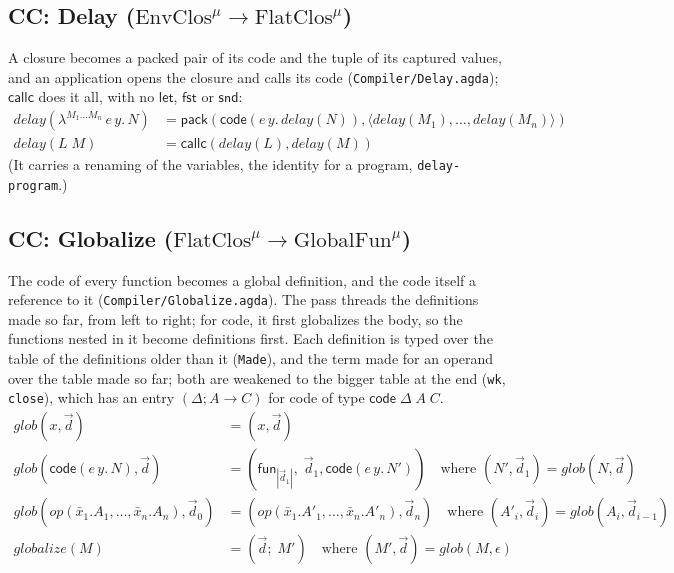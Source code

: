 \documentclass[10pt]{article}
\theoremstyle{acmplain}
\newcommand{\key}[1]{\mathsf{#1}}
\newcommand{\pass}[1]{\mathit{#1}}
\newcommand{\clos}[2]{\lambda^{#1}\, #2.\,}
\newcommand{\tuple}[1]{\langle #1 \rangle}
\newcommand{\funref}[1]{\key{fun}_{#1}}
\newcommand{\Tcodetm}[3]{\key{code}(#1\,#2.\,#3)}  %
\newcommand{\Tpack}[2]{\key{pack}(#1, #2)}     %
\newcommand{\Tcallc}[2]{\key{callc}(#1, #2)}   %
\newcommand{\Ml}[1]{\textrm{#1}^{\mu}}                  %
\newcommand{\Mcodety}[3]{\key{code}\;#1\;#2\;#3}          %
\begin{document}
\subsection{CC: Delay (\texorpdfstring{$\Ml{EnvClos} \to \Ml{FlatClos}$}{EnvClos-mu -> FlatClos-mu})}

A closure becomes a packed pair of its code and the tuple of its captured
values, and an application opens the closure and calls its code
(\texttt{Compiler/Delay.agda}); $\key{callc}$ does it all, with no
$\key{let}$, $\key{fst}$ or $\key{snd}$:
\begin{align*}
  \pass{delay}(\clos{M_1\ldots M_n}{e\,y} N) &=
    \Tpack{\Tcodetm{e}{y}{\pass{delay}(N)}}{\tuple{\pass{delay}(M_1),\ldots,\pass{delay}(M_n)}} \\
  \pass{delay}(L\;M) &= \Tcallc{\pass{delay}(L)}{\pass{delay}(M)}
\end{align*}
(It carries a renaming of the variables, the identity for a program,
\texttt{delay-program}.)

\subsection{CC: Globalize (\texorpdfstring{$\Ml{FlatClos} \to \Ml{GlobalFun}$}{FlatClos-mu -> GlobalFun-mu})}

The code of every function becomes a global definition, and the code
itself a reference to it (\texttt{Compiler/Globalize.agda}). The pass
threads the definitions made so far, from left to right; for code, it
first globalizes the body, so the functions nested in it become
definitions first. Each definition is typed over the table of the
definitions older than it (\texttt{Made}), and the term made for an
operand over the table made so far; both are weakened to the bigger table
at the end (\texttt{wk}, \texttt{close}), which has an entry
$(\Delta; A \to C)$ for code of type $\Mcodety{\Delta}{A}{C}$.
\begin{align*}
  \pass{glob}(x, \vec{d}) &= (x, \vec{d}) \\
  \pass{glob}(\Tcodetm{e}{y}{N}, \vec{d}) &= (\funref{|\vec{d}_1|},\; \vec{d}_1, \Tcodetm{e}{y}{N'})
     \quad\text{where } (N', \vec{d}_1) = \pass{glob}(N, \vec{d}) \\
  \pass{glob}(\mathit{op}(\bar{x}_1.A_1, \ldots, \bar{x}_n.A_n), \vec{d}_0)
     &= (\mathit{op}(\bar{x}_1.A'_1, \ldots, \bar{x}_n.A'_n), \vec{d}_n)
     \quad\text{where } (A'_i, \vec{d}_i) = \pass{glob}(A_i, \vec{d}_{i-1}) \\[1ex]
  \pass{globalize}(M) &= (\vec{d};\; M') \quad\text{where } (M', \vec{d}) = \pass{glob}(M, \epsilon)
\end{align*}
\end{document}
